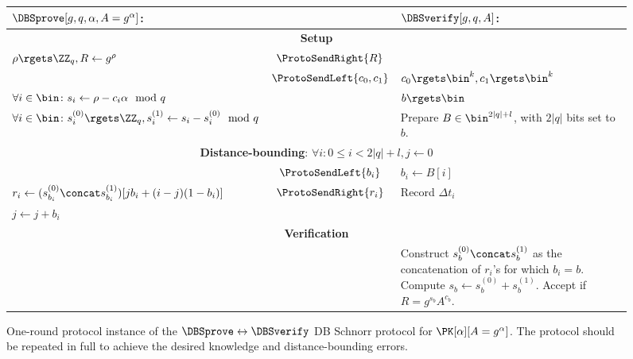 \begin{figure*}
  \centering
  \small
  \begin{tabular}{p{}cp{}}
    \(\DBSprove[g, q, \alpha, A = g^\alpha]\):
    & &
    \(\DBSverify[g, q, A]\):
    \\
    \midrule

    \multicolumn{3}{c}{\textbf{Setup}} \\

    \(\rho\rgets \ZZ_q, R\gets g^{\rho}\)
    & \(\ProtoSendRight{R}\)
    &
    \\

    & \(\ProtoSendLeft{c_0, c_1}\)
    & \(c_0\rgets \bin^k, c_1\rgets \bin^k\)
    \\

    \(\forall i\in\bin\colon s_i\gets \rho - c_i\alpha \mod q\)
    &
    & \(b\rgets \bin\)
    \\

    \(\forall i\in\bin\colon s_i^{(0)} \rgets \ZZ_q, s_i^{(1)} \gets s_i - 
      s_i^{(0)} \mod q\)
    &
    & Prepare \(B\in \bin^{2|q|+l}\), with \(2|q|\) bits set to \(b\).
    \\

    \midrule
    \multicolumn{3}{c}{\textbf{Distance-bounding}: \(\forall i: 0\leq i < 2|q| 
        + l, j\gets 0\)} \\


    & \(\ProtoSendLeft{b_i}\)
    & \(b_i\gets B[i]\)
    \\

    \(r_i\gets (s_{b_i}^{(0)}\concat s_{b_i}^{(1)})[jb_i + (i-j)(1-b_i)]\)
    & \(\ProtoSendRight{r_i}\)
    & Record \(\Delta t_i\)
    \\

    \(j \gets j + b_i\)
    &
    &
    \\

    \midrule
    \multicolumn{3}{c}{\textbf{Verification}}
    \\

    &
    & Construct \(s_b^{(0)}\concat s_b^{(1)}\) as the concatenation of 
    \(r_i\)'s for which \(b_i = b\).
    Compute \(s_b\gets s_b^{(0)} + s_b^{(1)}\).
      Accept if \(R = g^{s_b} A^{c_b}\).
    \\
    
  \end{tabular}
  \caption{%
    One-round protocol instance of the \(\DBSprove\leftrightarrow \DBSverify\) \ac{DB} Schnorr protocol for \(\PK[\alpha][A = g^\alpha]\).
    The protocol should be repeated in full to achieve the desired knowledge and distance-bounding errors.
  }%
  \label{SchnorrFigure}
\end{figure*}

